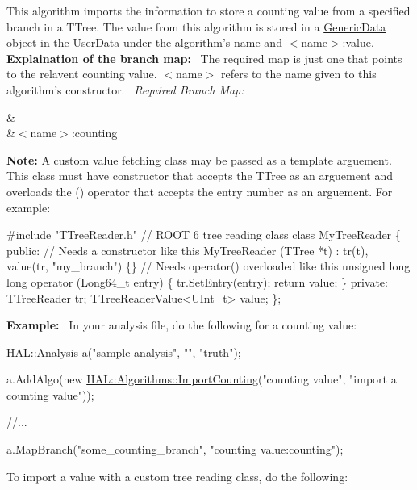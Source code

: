 This algorithm imports the information to store a counting value from a specified branch in a T\+Tree. The value from this algorithm is stored in a \hyperlink{class_h_a_l_1_1_generic_data}{Generic\+Data} object in the User\+Data under the algorithm's name and $<$name$>$\+:value.~\newline
~\newline
{\bfseries Explaination of the branch map\+:}~\newline
The required map is just one that points to the relavent counting value. $<$name$>$ refers to the name given to this algorithm's constructor.~\newline
{\itshape Required Branch Map\+:} \begin{TabularC}{2}
\hline
{}&\PBS{}\\
&\PBS\centering $<$name$>$\+:counting \\
\end{TabularC}
{\bfseries Note\+:} A custom value fetching class may be passed as a template arguement. This class must have constructor that accepts the T\+Tree as an arguement and overloads the () operator that accepts the entry number as an arguement. For example\+: 
\begin{DoxyCode}
\textcolor{preprocessor}{#include "TTreeReader.h"} \textcolor{comment}{// ROOT 6 tree reading class}
\textcolor{keyword}{class }MyTreeReader \{
\textcolor{keyword}{public}:
 \textcolor{comment}{// Needs a constructor like this}
 MyTreeReader (TTree *t) : tr(t), value(tr, \textcolor{stringliteral}{"my\_branch"}) \{\}
 \textcolor{comment}{// Needs operator() overloaded like this}
 \textcolor{keywordtype}{unsigned} \textcolor{keywordtype}{long} \textcolor{keywordtype}{long} operator (Long64\_t entry) \{
   tr.SetEntry(entry);
   \textcolor{keywordflow}{return} value;
 \}
\textcolor{keyword}{private}:
 TTreeReader tr;
 TTreeReaderValue<UInt\_t> value;
\};
\end{DoxyCode}
 {\bfseries Example\+:}~\newline
In your analysis file, do the following for a counting value\+:


\begin{DoxyCode}
\hyperlink{class_h_a_l_1_1_analysis}{HAL::Analysis} a(\textcolor{stringliteral}{"sample analysis"}, \textcolor{stringliteral}{""}, \textcolor{stringliteral}{"truth"});

a.AddAlgo(\textcolor{keyword}{new} \hyperlink{class_h_a_l_1_1_algorithms_1_1_import_counting_value}{HAL::Algorithms::ImportCounting}(\textcolor{stringliteral}{"counting value"}, \textcolor{stringliteral}{"import a
       counting value"}));

\textcolor{comment}{//...}

a.MapBranch(\textcolor{stringliteral}{"some\_counting\_branch"}, \textcolor{stringliteral}{"counting value:counting"});
\end{DoxyCode}
 To import a value with a custom tree reading class, do the following\+:


